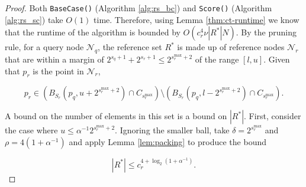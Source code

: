 \begin{proof}
Both \texttt{BaseCase()} (Algorithm \ref{alg:rs_bc}) and \texttt{Score()}
(Algorithm \ref{alg:rs_sc}) take $O(1)$ time.  Therefore, using Lemma
\ref{thm:ct-runtime} we know that the runtime of the algorithm is bounded by
$O(c_r^4 \nu |R^*| N)$. %
By the pruning rule, for a query node
$\mathscr{N}_q$, the reference set $R^*$
is made up of reference nodes $\mathscr{N}_r$ that are within a margin of
$2^{s_q + 1} + 2^{s_r + 1} \le 2^{s_r^{\max} + 2}$ of the range $[l, u]$.  Given
that $p_r$ is the point in $\mathscr{N}_r$,

\begin{equation}
p_r \in \left( B_{S_r}(p_q, u + 2^{s_r^{\max} + 2}) \cap
C_{s_r^{\max}}\right)\setminus \left( B_{S_r}(p_q, l - 2^{s_r^{\max} + 2}) \cap
C_{s_r^{\max}} \right). \label{eqn:rsballs}
\end{equation}

A bound on the number of elements in this set is a bound on $|R^*|$.  %
First, consider the case where $u \le \alpha^{-1} 2^{s_r^{\max} + 2}$.  Ignoring
the smaller ball, take $\delta = 2^{s_r^{\max}}$ and $\rho = 4 (1 +
\alpha^{-1})$ and apply Lemma \ref{lem:packing} to produce the bound

\begin{equation}
|R^*| \le c_r^{4 + \log_2(1 + \alpha^{-1})}.
\end{equation}




\end{proof}
